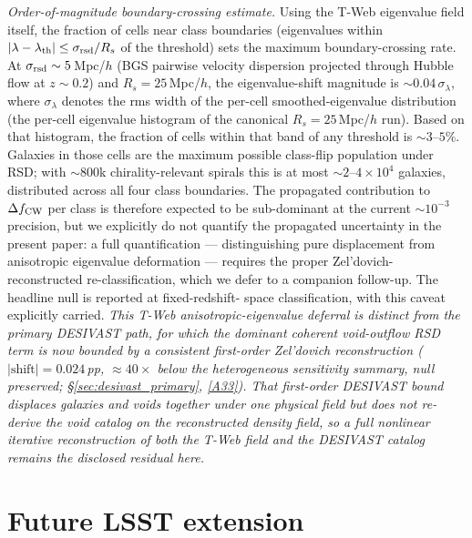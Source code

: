\documentclass[aps,prd,twocolumn,superscriptaddress,showpacs,preprintnumbers,nofootinbib,longbibliography,floatfix]{revtex4-2}
\newcommand{\repoBase}{https://github.com/Hubify-Projects/bigbounce/blob/main}
\begin{document}
\begin{itemize}
\emph{Order-of-magnitude boundary-crossing estimate.}
Using the T-Web eigenvalue field itself, the fraction of cells near
class boundaries (eigenvalues within $|\lambda - \lambda_{\rm th}|
\le \sigma_{\rm rsd}/R_s$ of the threshold) sets the maximum
boundary-crossing rate. At $\sigma_{\rm rsd} \sim 5$\,Mpc/$h$ (BGS
pairwise velocity dispersion projected through Hubble flow at
$z\!\sim\!0.2$) and $R_s\!=\!25$\,Mpc/$h$, the eigenvalue-shift
magnitude is $\sim 0.04\,\sigma_\lambda$, where $\sigma_\lambda$
denotes the rms width of the per-cell smoothed-eigenvalue
distribution (the per-cell eigenvalue histogram of the canonical
$R_s\!=\!25$\,Mpc/$h$ run). Based on that histogram,
the fraction of cells within that band of any threshold is
$\sim 3$--$5\%$. Galaxies in those cells are the maximum possible
class-flip population under RSD; with $\sim 800$k chirality-relevant
spirals this is at most $\sim 2$--$4\times 10^4$ galaxies, distributed
across all four class boundaries. The propagated contribution to
$\Delta f_{\rm CW}$ per class is therefore expected to be
sub-dominant at the current $\sim 10^{-3}$ precision, but we
explicitly do not quantify the propagated uncertainty in the
present paper:
a full quantification — distinguishing pure displacement from
anisotropic eigenvalue deformation — requires the proper
Zel'dovich-reconstructed re-classification, which we defer to a
companion follow-up. The headline null is reported at fixed-redshift-
space classification, with this caveat explicitly carried.
\emph{This T-Web anisotropic-eigenvalue deferral is distinct from the
\emph{primary} DESIVAST path, for which the dominant coherent
void-outflow RSD term is now bounded by a consistent first-order
Zel'dovich reconstruction ($|\text{shift}| = 0.024$\,pp, ${\approx}40\times$
below the heterogeneous sensitivity summary, null preserved;
\S\ref{sec:desivast_primary},
\href{\repoBase/pipelines/p5\_desi\_chirality/outputs/27\_rsd\_void\_recon\_bound.json}{[A33]}).
That first-order DESIVAST bound displaces galaxies and voids together
under one physical field but does not re-derive the void catalog on the
reconstructed density field, so a full nonlinear iterative
reconstruction of both the T-Web field and the DESIVAST catalog remains
the disclosed residual here.}
\end{itemize}

\section{Future LSST extension}\label{sec:lsst}
\end{document}
